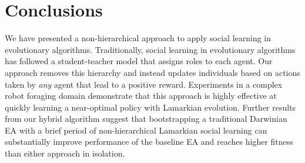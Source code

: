 \documentclass{acm_proc_article-sp}
\begin{document}
\section{Conclusions}
\label{sec:conclusions}
We have presented a non-hierarchical approach to apply social learning in evolutionary algorithms. Traditionally, social learning in evolutionary algorithms has followed a student-teacher model that assigns roles to each agent. Our approach removes this hierarchy and instead updates individuals based on actions taken by \textit{any} agent that lead to a positive reward. Experiments in a complex robot foraging domain demonstrate that this approach is highly effective at quickly learning a near-optimal policy with Lamarkian evolution. Further results from our hybrid algorithm suggest that bootstrapping a traditional Darwinian EA with a brief period of non-hierarchical Lamarkian social learning can substantially improve performance of the baseline EA and reaches higher fitness than either approach in isolation.
%

%
%
\end{document}
